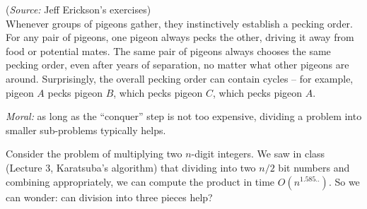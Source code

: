 \documentclass[addpoints]{exam}
\begin{document}
\begin{questions}

({\em Source:} Jeff Erickson's exercises)\\
Whenever groups of pigeons gather, they instinctively establish a pecking order. For any pair of pigeons, one pigeon always pecks the other, driving it away from food or potential mates. The same pair of pigeons always chooses the same pecking order, even after years of separation, no matter what other pigeons are around. Surprisingly, the overall pecking order can contain cycles -- for example, pigeon $A$ pecks pigeon $B$, which pecks pigeon $C$, which pecks pigeon $A$. 


{\em Moral:} as long as the ``conquer'' step is not too expensive, dividing a problem into smaller sub-problems typically helps. 

Consider the problem of multiplying two $n$-digit integers.  We saw in class (Lecture 3, Karatsuba's algorithm) that dividing into two $n/2$ bit numbers and combining appropriately, we can compute the product in time $O(n^{1.585..})$. So we can wonder: can division into three pieces help?


\end{questions}
\end{document}
